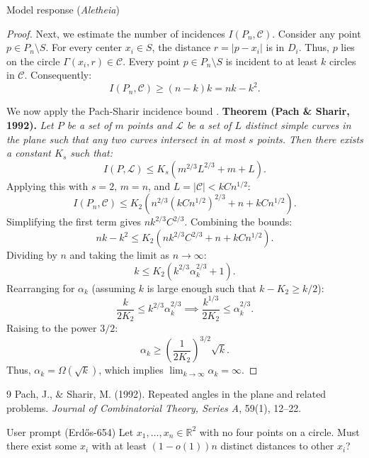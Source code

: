 \documentclass[11pt]{article}
\begin{document}
\begin{solution}{Model response (\emph{Aletheia})}
\begin{proof}
Next, we estimate the number of incidences $I(P_n, \mathcal{C})$. Consider any point $p \in P_n \setminus S$. For every center $x_i \in S$, the distance $r = |p - x_i|$ is in $D_i$. Thus, $p$ lies on the circle $\Gamma(x_i, r) \in \mathcal{C}$. Every point $p \in P_n \setminus S$ is incident to at least $k$ circles in $\mathcal{C}$. Consequently:
\[ I(P_n, \mathcal{C}) \geq (n - k) k = nk - k^2. \]

We now apply the Pach-Sharir incidence bound \cite{pach1992}.
\textbf{Theorem (Pach \& Sharir, 1992).} \textit{Let $P$ be a set of $m$ points and $\mathcal{L}$ be a set of $L$ distinct simple curves in the plane such that any two curves intersect in at most $s$ points. Then there exists a constant $K_s$ such that:}
\[ I(P, \mathcal{L}) \leq K_s \left( m^{2/3} L^{2/3} + m + L \right). \]
Applying this with $s=2$, $m=n$, and $L = |\mathcal{C}| < k C n^{1/2}$:
\[ I(P_n, \mathcal{C}) \leq K_2 \left( n^{2/3} (k C n^{1/2})^{2/3} + n + k C n^{1/2} \right). \]
Simplifying the first term gives $n k^{2/3} C^{2/3}$. Combining the bounds:
\[ nk - k^2 \leq K_2 \left( n k^{2/3} C^{2/3} + n + k C n^{1/2} \right). \]
Dividing by $n$ and taking the limit as $n \to \infty$:
\[ k \leq K_2 \left( k^{2/3} \alpha_k^{2/3} + 1 \right). \]
Rearranging for $\alpha_k$ (assuming $k$ is large enough such that $k - K_2 \geq k/2$):
\[ \frac{k}{2 K_2} \leq k^{2/3} \alpha_k^{2/3} \implies \frac{k^{1/3}}{2 K_2} \leq \alpha_k^{2/3}. \]
Raising to the power $3/2$:
\[ \alpha_k \geq \left(\frac{1}{2 K_2}\right)^{3/2} \sqrt{k}. \]
Thus, $\alpha_k = \Omega(\sqrt{k})$, which implies $\lim_{k \to \infty} \alpha_k = \infty$.
\end{proof}

\begin{thebibliography}{9}
Pach, J., \& Sharir, M. (1992). Repeated angles in the plane and related problems. \textit{Journal of Combinatorial Theory, Series A}, 59(1), 12–22.
\end{thebibliography}
\end{solution}

\begin{problem}{User prompt (Erd\H{o}s-654)}
Let $x_1,\ldots,x_n\in \mathbb{R}^2$ with no four points on a circle. Must there exist some $x_i$ with at least $(1-o(1))n$ distinct distances to other $x_i$?
\end{problem}
\end{document}
